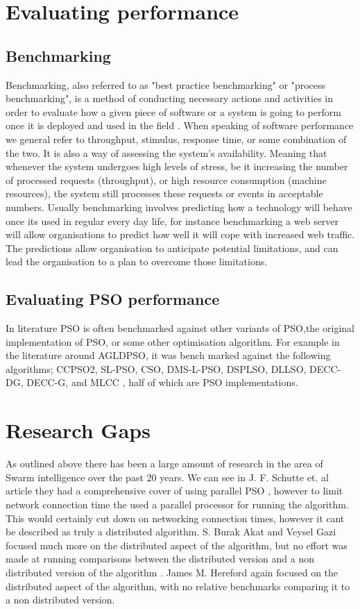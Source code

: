 \documentclass[oneside,12pt]{book}
\begin{document}
\section{Evaluating performance}
\subsection{Benchmarking}
Benchmarking, also referred to as "best practice benchmarking" or "process benchmarking", is  a  method  of  conducting  necessary  actions  and  activities  in  order  to evaluate  how  a  given  piece  of  software  or  a  system  is  going  to perform  once  it  is deployed and used in the field \cite{vokolos1998performance}. When speaking of software performance we general refer to throughput, stimulus, response time, or some combination of the two\cite{vokolos1998performance}.  It is also a way of assessing the system’s availability. Meaning that whenever the system undergoes high levels of stress, be it increasing the number of processed requests (throughput), or high resource consumption (machine resources), the system still processes these requests or events in acceptable numbers\cite{vokolos1998performance}.  Usually benchmarking involves predicting how a technology will behave once its used in regular every day life, for instance benchmarking a web server will allow organisations to predict how well it will cope with increased web traffic. The predictions allow organisation to anticipate potential limitations, and can lead the organisation to a plan to overcome those limitations. 

\subsection{Evaluating PSO performance}
 In literature PSO is often benchmarked against other variants of PSO,the original implementation of PSO, or some other optimisation algorithm. For example in the literature around AGLDPSO, it was bench marked against  the following algorithms; CCPSO2, SL-PSO, CSO, DMS-L-PSO, DSPLSO, DLLSO, DECC-DG, DECC-G, and MLCC \cite{wang2020adaptive}, half of which are PSO implementations. 
\section{Research Gaps}
As outlined above there has been a large amount of research in the area of Swarm intelligence over the past 20 years. We can see in J. F. Schutte et. al article they had a comprehensive cover of using parallel PSO \cite{schutte2004parallel}, however to limit network connection time the used a parallel processor for running the algorithm. This would certainly cut down on networking connection times, however it cant be described as truly a distributed algorithm. S. Burak Akat and Veysel Gazi focused much more on the distributed aspect of the algorithm, but no effort was made at running comparisons between the distributed version and a non distributed version of the algorithm \cite{akat_gazi_2008}. James M. Hereford again focused on the distributed aspect of the algorithm, with no relative benchmarks comparing it to a non distributed version. \cite{hereford_2006}
\end{document}
